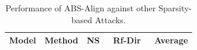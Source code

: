 \begin{table}[htbp]
    \centering
    \caption{Performance of ABS-Align against other Sparsity-based Attacks.}
    \label{tab:white_box_attacks}

    \setlength{\tabcolsep}{2pt}
    \renewcommand{\arraystretch}{0.7}
    \small
        
        
        
        
         

    \begin{tabular}{ll cc c}
        \toprule
        \textbf{Model} & \textbf{Method} & \textbf{NS~\cite{wu2026neurostrike}} & \textbf{Rf-Dir~\cite{arditi2024refusal}} & \textbf{Average} \\
        \midrule
        

\end{tabular}
\end{table}
